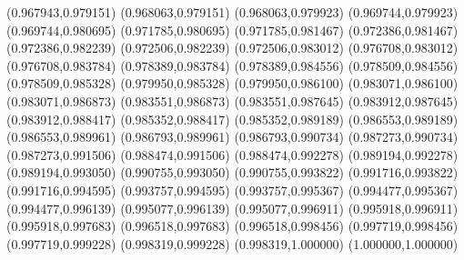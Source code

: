 (0.967943,0.979151)
(0.968063,0.979151)
(0.968063,0.979923)
(0.969744,0.979923)
(0.969744,0.980695)
(0.971785,0.980695)
(0.971785,0.981467)
(0.972386,0.981467)
(0.972386,0.982239)
(0.972506,0.982239)
(0.972506,0.983012)
(0.976708,0.983012)
(0.976708,0.983784)
(0.978389,0.983784)
(0.978389,0.984556)
(0.978509,0.984556)
(0.978509,0.985328)
(0.979950,0.985328)
(0.979950,0.986100)
(0.983071,0.986100)
(0.983071,0.986873)
(0.983551,0.986873)
(0.983551,0.987645)
(0.983912,0.987645)
(0.983912,0.988417)
(0.985352,0.988417)
(0.985352,0.989189)
(0.986553,0.989189)
(0.986553,0.989961)
(0.986793,0.989961)
(0.986793,0.990734)
(0.987273,0.990734)
(0.987273,0.991506)
(0.988474,0.991506)
(0.988474,0.992278)
(0.989194,0.992278)
(0.989194,0.993050)
(0.990755,0.993050)
(0.990755,0.993822)
(0.991716,0.993822)
(0.991716,0.994595)
(0.993757,0.994595)
(0.993757,0.995367)
(0.994477,0.995367)
(0.994477,0.996139)
(0.995077,0.996139)
(0.995077,0.996911)
(0.995918,0.996911)
(0.995918,0.997683)
(0.996518,0.997683)
(0.996518,0.998456)
(0.997719,0.998456)
(0.997719,0.999228)
(0.998319,0.999228)
(0.998319,1.000000)
(1.000000,1.000000)